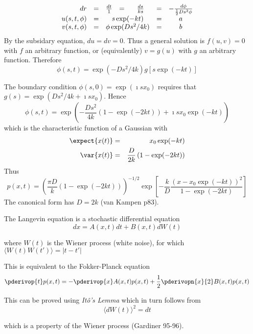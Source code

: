 \documentclass{beamer}
\begin{document}
\begin{frame}{}
\[
\begin{array}{rccccccl}
dr & = & \frac{dt}{1} & = & \frac{ds}{ks} & = & -\frac{d\phi}{\frac{1}{2} Ds^2 \phi} \\
u(s,t,\phi) & = & \multicolumn{3}{c}{s\exp(-kt)} & = & a \\
v(s,t,\phi) & = & \multicolumn{3}{c}{\phi\exp(Ds^2/4k)} & = & b
\end{array}
\]
By the subsidary equation, $du=dv=0$.
Thus a general solution %
is $f(u,v)=0$ with $f$ an arbitrary function,
or (equivalently) $v=g(u)$ with $g$ an arbitrary function.
Therefore
\[
\phi(s,t) = \exp(-Ds^2/4k) g\left[ s \exp(-kt) \right]
\]
\end{frame}
\begin{frame}{}
The boundary condition $\phi(s,0)=\exp(\imath sx_0)$ requires that $g(s) = \exp(Ds^2/4k + \imath sx_0)$.
Hence
\[
\phi(s,t) = \exp \left( -\frac{Ds^2}{4k} (1 - \exp(-2kt))  + \imath sx_0 \exp(-kt) \right)
\]
which is the characteristic function of a Gaussian with
\begin{eqnarray*}
\expect{x(t)} & = & x_0 \exp(-kt) \\
\var{x(t)} & = & \frac{D}{2k} \left( 1 - \exp(-2kt) \right)
\end{eqnarray*}
Thus
\[
p(x,t) = \left( \frac{\pi D}{k}(1-\exp(-2kt)) \right)^{-1/2} \exp \left[ -\frac{k}{D} \frac{(x - x_0 \exp(-kt))^2}{1-\exp(-2kt)} \right]
\]
The canonical form has $D=2k$ (van Kampen p83).
\end{frame}

\begin{frame}{}

The Langevin equation is a stochastic differential equation
\[
dx = A(x,t) dt + B(x,t) dW(t)
\]

where $W(t)$ is the Wiener process (white noise), for which $\langle W(t)W(t') \rangle = |t-t'|$

This is equivalent to the Fokker-Planck equation
\[
\pderivop{t} p(x,t) = -\pderivop{x} A(x,t)p(x,t) + \frac{1}{2} \pderivopn{x}{2} B(x,t)p(x,t)
\]

This can be proved using {\em It\^{o}'s Lemma} which in turn follows from
\[
\langle dW(t) \rangle^2 = dt
\]

which is a property of the Wiener process (Gardiner 95-96).

\end{frame}

%   
%   
%   
%  
\end{document}
